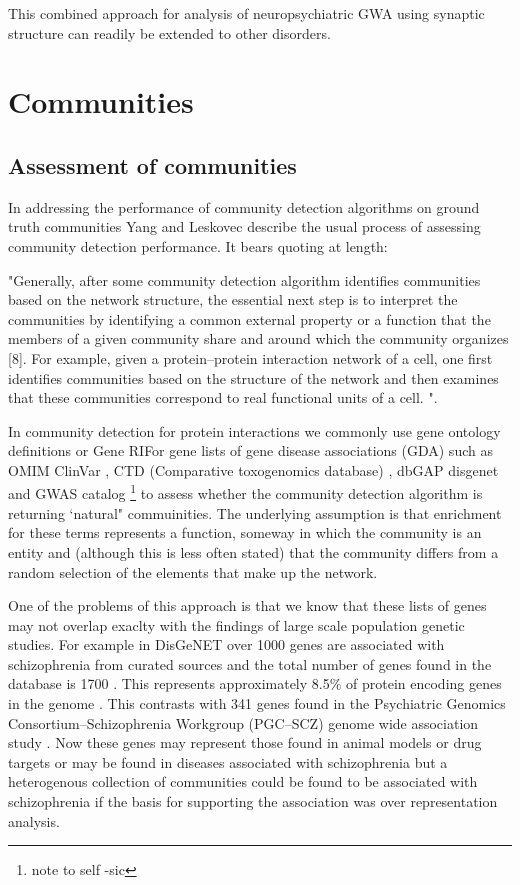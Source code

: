 This combined approach for analysis of neuropsychiatric GWA using synaptic structure can readily be extended to other disorders. 


\section{Communities}
\label{sec:alternate intro}
\subsection{Assessment of communities}

In addressing the performance of community detection algorithms on ground truth communities Yang and Leskovec describe the usual process of assessing community detection performance. It bears quoting at length:

"Generally, after some community detection algorithm identifies communities based on the network structure, the essential next step is to interpret the communities by identifying a common external property or a function that the members of a given community share and around which the community organizes [8]. For example, given a protein–protein interaction network of a cell, one first identifies communities based on the structure of the network and then examines that these communities correspond to real functional units of a cell. ". \cite{yang2015defining}

In community detection for protein interactions we commonly  use gene ontology definitions or Gene RIFor gene lists of gene disease associations (GDA) such as OMIM \cite{hamosh2005online} ClinVar \cite{landrum2016clinvar}, CTD (Comparative toxogenomics database) \cite{davis2019comparative}, dbGAP \cite{tryka2014ncbi} disgenet \cite{pinero2020disgenet} \cite{pinero2016disgenet} and GWAS catalog \footnote{note to self -sic} \cite{welter2014nhgri} to assess whether the community detection algorithm is returning `natural" commuinities. The underlying assumption is that enrichment for these terms represents a function, someway in which the community is an entity and (although this is less often stated) that the community differs from a random selection of the elements that make up the network. 

One of the problems of this approach is that we know that these lists of genes may not overlap exaclty with the findings of large scale population genetic studies. For example in DisGeNET over 1000 genes are associated with schizophrenia from curated sources and the total number of genes found in the database is 1700 \cite{pinero2020disgenet}. This represents approximately 8.5\% of protein encoding genes in the genome \cite{ezkurdia2014multiple}. This 
contrasts with 341 genes found in the Psychiatric Genomics Consortium–Schizophrenia Workgroup (PGC–SCZ) genome wide association study \cite{ripke2014biological}. Now these genes may represent those found in animal models or drug targets or may be found in diseases associated with schizophrenia but a heterogenous collection of communities could be found to be associated with schizophrenia if the basis for supporting the association was over representation analysis. 

